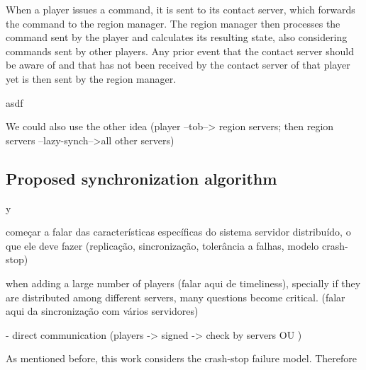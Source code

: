 \documentclass[]{usiinfprospectus}
\begin{document}
When a player issues a command, it is sent to its contact server, which forwards the command to the region manager. The region manager then processes the command sent by the player and calculates its resulting state, also considering commands sent by other players. Any prior event that the contact server should be aware of and that has not been received by the contact server of that player yet is then sent by the region manager.

asdf

We could also use the other idea (player --tob--> region servers; then region servers --lazy-synch-->all other servers)


\subsection{Proposed synchronization algorithm} \label{sec:algorithm}

y


começar a falar das características específicas do sistema servidor distribuído, o que ele deve fazer (replicação, sincronização, tolerância a falhas, modelo crash-stop)

when adding a large number of players (falar aqui de timeliness), specially if they are distributed among different servers, many questions become critical. (falar aqui da sincronização com vários servidores)

- direct communication (players -> signed -> check by servers OU )


As mentioned before, this work considers the crash-stop failure model. Therefore



\end{document}
